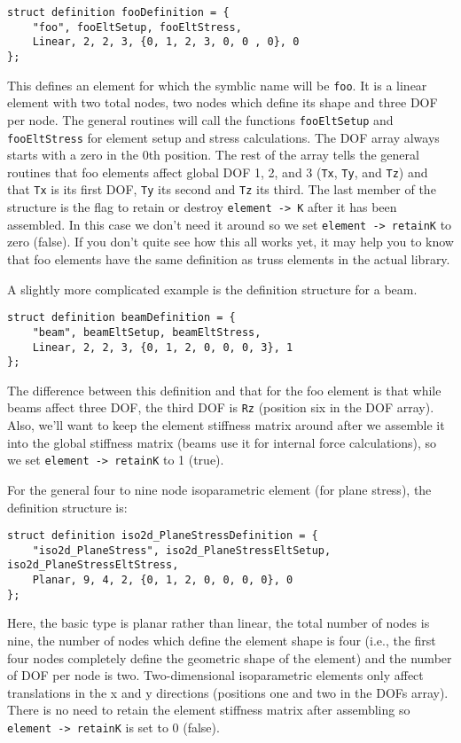 \begin{screen}
 \begin{verbatim}
struct definition fooDefinition = {   
    "foo", fooEltSetup, fooEltStress, 
    Linear, 2, 2, 3, {0, 1, 2, 3, 0, 0 , 0}, 0
};
 \end{verbatim}
\end{screen}

This defines an element for which the symblic name will be {\tt foo}.  It is
a linear element with two total nodes, two nodes which define its shape
and three DOF per node.  The general \felt{} routines will call the functions
{\tt fooEltSetup} and {\tt fooEltStress} for element setup and stress 
calculations.  The DOF array always starts with a zero in the
0th position.  The rest of the array tells the general \felt{} routines that
foo elements affect global DOF 1, 2, and 3 ({\tt Tx}, {\tt Ty}, and 
{\tt Tz}) and that {\tt Tx} is its
first DOF, {\tt Ty} its second and {\tt Tz} its third.  The last member of the
structure is the flag to retain or destroy \mbox{{\tt element -> K}} after
it has been assembled.  In this case we don't need it around so we set
\mbox{{\tt element -> retainK}} to zero (false).  If you don't quite see 
how this all works yet, it may help you to know that foo elements have the 
same definition as truss elements in the actual \felt{} library.

A slightly more complicated example is the definition structure for a beam.
\begin{screen}
 \begin{verbatim}
struct definition beamDefinition = {
    "beam", beamEltSetup, beamEltStress, 
    Linear, 2, 2, 3, {0, 1, 2, 0, 0, 0, 3}, 1
};
 \end{verbatim}
\end{screen}
The difference between this definition and that for the foo element is that
while beams affect three DOF, the third DOF is {\tt Rz} 
(position six in the DOF array).  Also, we'll want to keep the element
stiffness matrix around after we assemble it into the global stiffness
matrix (beams use it for internal force calculations), so we set 
\mbox{{\tt element -> retainK}} to 1 (true).

For the general four to nine node isoparametric element (for plane stress),
the definition structure is:
\begin{screen}
 \begin{verbatim}
struct definition iso2d_PlaneStressDefinition = {
    "iso2d_PlaneStress", iso2d_PlaneStressEltSetup, iso2d_PlaneStressEltStress,
    Planar, 9, 4, 2, {0, 1, 2, 0, 0, 0, 0}, 0
};
 \end{verbatim}
\end{screen}
Here, the basic type is planar rather than linear, the total number of nodes
is nine, the number of nodes which define the element shape is four (i.e.,
the first four nodes completely define the geometric shape of the element)
and the number of DOF per node is two.  Two-dimensional isoparametric
elements only affect translations in the x and y directions (positions one and
two in the DOFs array).  There is no need to retain the element stiffness
matrix after assembling so \mbox{{\tt element -> retainK}} is set to 0 (false). 

